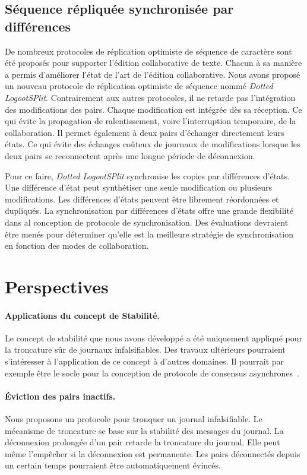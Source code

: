 \subsection{Séquence répliquée synchronisée par différences}

De nombreux protocoles de réplication optimiste de séquence de caractère sont été proposés pour supporter l'édition collaborative de texte.
Chacun à sa manière a permis d'améliorer l'état de l'art de l'édition collaborative.
Nous avons proposé un nouveau protocole de réplication optimiste de séquence nommé \emph{Dotted LogootSPlit}.
Contrairement aux autres protocoles, il ne retarde pas l'intégration des modifications des pairs.
Chaque modification est intégrée dès sa réception.
Ce qui évite la propagation de ralentissement, voire l'interruption temporaire, de la collaboration.
Il permet également à deux pairs d'échanger directement leurs états.
Ce qui évite des échanges coûteux de journaux de modifications lorsque les deux pairs se reconnectent après une longue période de déconnexion.

Pour ce faire, \emph{Dotted LogootSPlit} synchronise les copies par différences d'états.
Une différence d'état peut synthétiser une seule modification ou plusieurs modifications.
Les différences d'états peuvent être librement réordonnées et dupliqués.
La synchronisation par différences d'états offre une grande flexibilité dans al conception de protocole de synchronisation.
Des évaluations devraient être menés pour déterminer qu'elle est la meilleure stratégie de synchronisation en fonction des modes de collaboration.


\section{Perspectives}

\paragraph{Applications du concept de Stabilité.} Le concept de stabilité que nous avons développé a été uniquement appliqué pour la troncature sûr de journaux infalsifiables.
Des travaux ultérieurs pourraient s'intéresser à l'application de ce concept à d'autres domaines.
Il pourrait par exemple être le socle pour la conception de protocole de consensus asynchrones~\autocite{bracha1985asynchronous}.

\paragraph{Éviction des pairs inactifs.}
Nous proposons un protocole pour tronquer un journal infalsifiable.
Le mécanisme de troncature se base sur la stabilité des messages du journal.
La déconnexion prolongée d'un pair retarde la troncature du journal.
Elle peut même l'empêcher si la déconnexion est permanente.
Les pairs déconnectés depuis un certain temps pourraient être automatiquement évincés.

